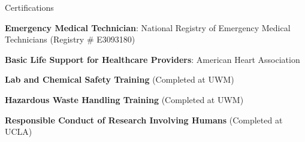 \documentclass[10pt, oneside]{article}
\begin{document}
\begin{cvlist}{Certifications}
	\vspace{-1mm}
	\item  \textbf{Emergency Medical Technician}: National Registry of Emergency Medical Technicians (Registry \# E3093180)
	\item  \textbf{Basic Life Support for Healthcare Providers}: American Heart Association
	\item  \textbf{Lab and Chemical Safety Training} (Completed at UWM)
	\item  \textbf{Hazardous Waste Handling Training} (Completed at UWM) 
	\item \textbf{Responsible Conduct of Research Involving Humans} (Completed at UCLA)
\end{cvlist}

\begin{comment}

    \begin{cvlist}{Technical Skills}
        \vphantom{a}
        \phantom{a}
        \item 
        \item
        \vspace{-3mm}
            \hspace{-2mm}
            \begin{tabular}{lll} 
                \textbf{Hardware}   & \textbf{Software} &    \\
                Arduino microcontrollers & MATLAB   &    \\
                Soldering                & Python   &    \\
                Circuit Board Etching    & EAGLE    &   
            \end{tabular}
    
    \end{cvlist}

\end{comment}
\end{document}

